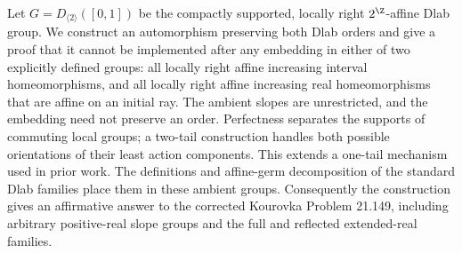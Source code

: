 Let $G=D_{\langle2\rangle}([0,1])$ be the compactly supported,
locally right $2^{\Z}$-affine Dlab group. We construct an automorphism
preserving both Dlab orders and give a proof that it cannot be implemented
after any embedding in either of two explicitly defined groups: all locally
right affine increasing interval homeomorphisms, and all locally right
affine increasing real homeomorphisms that are affine on an initial ray.
The ambient slopes are unrestricted, and the embedding need not preserve
an order. Perfectness separates the supports of commuting local groups;
a two-tail construction handles both possible orientations of their least
action components. This extends a one-tail mechanism used in prior work.
The definitions and affine-germ decomposition of the standard Dlab
families place them in these ambient groups. Consequently the construction
gives an affirmative answer to the corrected Kourovka Problem 21.149,
including arbitrary positive-real slope groups and the full and reflected
extended-real families.
